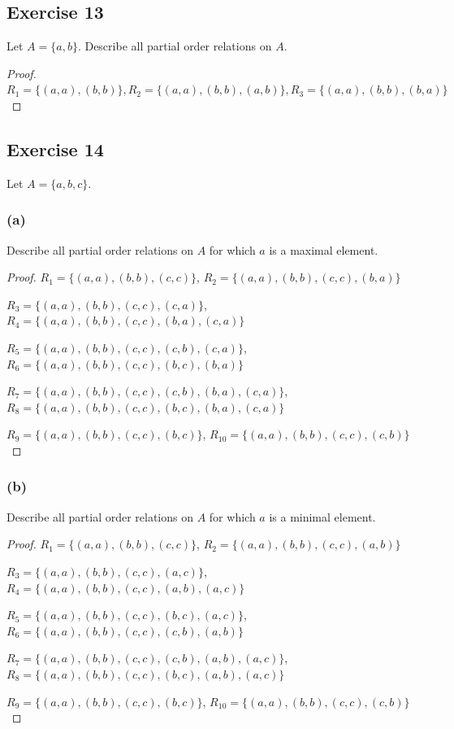 \documentclass[14pt]{extarticle}
\begin{document}
\subsection{Exercise 13}
Let \(A = \{a, b\}\). Describe all partial order relations on \(A\).

\begin{proof}
        \(R_1 = \{(a, a), (b, b)\}, R_2 = \{(a, a), (b, b), (a, b)\}, R_3 = \{(a, a), (b, b), (b, a)\}\)
\end{proof}

\subsection{Exercise 14}
Let \(A = \{a, b, c\}\).

\subsubsection{(a)}
Describe all partial order relations on \(A\) for which \(a\) is a maximal element.

\begin{proof}
        \(R_1 = \{(a, a), (b, b), (c, c)\}\), \(R_2 = \{(a, a), (b, b), (c, c), (b, a)\}\)

        \(R_3 = \{(a, a), (b, b), (c, c), (c, a)\}\), \(R_4 = \{(a, a), (b, b), (c, c), (b, a), (c, a)\}\)

        \(R_5 = \{(a, a), (b, b), (c, c), (c, b), (c, a)\}\), \(R_6 = \{(a, a), (b, b), (c, c), (b, c), (b, a)\}\)

        \(R_7 = \{(a, a), (b, b), (c, c), (c, b), (b, a), (c, a)\}\), \(R_8 = \{(a, a), (b, b), (c, c), (b, c), (b, a), (c, a)\}\)

        \(R_9 = \{(a, a), (b, b), (c, c), (b, c)\}\), \(R_{10} = \{(a, a), (b, b), (c, c), (c, b)\}\)
\end{proof}

\subsubsection{(b)}
Describe all partial order relations on \(A\) for which \(a\) is a minimal element.

\begin{proof}
        \(R_1 = \{(a, a), (b, b), (c, c)\}\), \(R_2 = \{(a, a), (b, b), (c, c), (a, b)\}\)

        \(R_3 = \{(a, a), (b, b), (c, c), (a, c)\}\), \(R_4 = \{(a, a), (b, b), (c, c), (a, b), (a, c)\}\)

        \(R_5 = \{(a, a), (b, b), (c, c), (b, c), (a, c)\}\), \(R_6 = \{(a, a), (b, b), (c, c), (c, b), (a, b)\}\)

        \(R_7 = \{(a, a), (b, b), (c, c), (c, b), (a, b), (a, c)\}\), \(R_8 = \{(a, a), (b, b), (c, c), (b, c), (a, b), (a, c)\}\)

        \(R_9 = \{(a, a), (b, b), (c, c), (b, c)\}\), \(R_{10} = \{(a, a), (b, b), (c, c), (c, b)\}\)

\end{proof}
\end{document}
